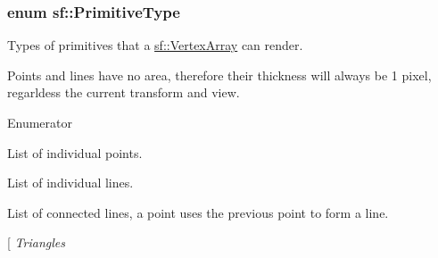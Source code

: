 \hypertarget{group__graphics_ga5ee56ac1339984909610713096283b1b}{
\subsubsection[{Primitive\+Type}]{\setlength{\rightskip}{0pt plus 5cm}enum {\bf sf\+::\+Primitive\+Type}}}\label{group__graphics_ga5ee56ac1339984909610713096283b1b}


Types of primitives that a \hyperlink{classsf_1_1_vertex_array}{sf\+::\+Vertex\+Array} can render. 

Points and lines have no area, therefore their thickness will always be 1 pixel, regarldess the current transform and view. \begin{Desc}
\item[Enumerator]\par
\begin{description}
\item[{\em 
\hypertarget{group__graphics_gga5ee56ac1339984909610713096283b1bac7097d3e01778b9318def1f7ac35a785}{Points}\label{group__graphics_gga5ee56ac1339984909610713096283b1bac7097d3e01778b9318def1f7ac35a785}
}]List of individual points. \item[{\em 
\hypertarget{group__graphics_gga5ee56ac1339984909610713096283b1ba2bf015eeff9f798dfc3d6d744d669f1e}{Lines}\label{group__graphics_gga5ee56ac1339984909610713096283b1ba2bf015eeff9f798dfc3d6d744d669f1e}
}]List of individual lines. \item[{\em 
\hypertarget{group__graphics_gga5ee56ac1339984909610713096283b1ba5b09910f5d0f39641342184ccd0d1de3}{Lines\+Strip}\label{group__graphics_gga5ee56ac1339984909610713096283b1ba5b09910f5d0f39641342184ccd0d1de3}
}]List of connected lines, a point uses the previous point to form a line. \item[{\em 
\hypertarget{group__graphics_gga5ee56ac1339984909610713096283b1ba880a7aa72c20b9f9beb7eb64d2434670}{Triangles}\label{group__graphics_gga5ee56ac1339984909610713096283b1ba880a7aa72c20b9f9beb7eb64d2434670}
}
\end{description}
\end{Desc}
